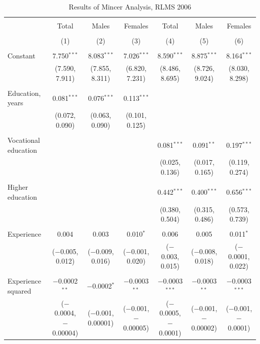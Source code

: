 \documentclass[alpha-refs]{wiley-article-01g}
\begin{document}
\begin{landscape}

\fontsize{9}{11}
\selectfont

\begin{table}[!htbp] \centering 
\renewcommand{\arraystretch}{1.0}
  \caption{Results of Mincer Analysis, RLMS 2006} 
  \label{} 
\begin{tabular}{@{\extracolsep{5pt}}lcccccc} 
\\[-1.8ex]\hline 
\hline \\[-1.8ex] 
 & Total & Males & Females & Total & Males & Females \\ 
\\[-1.8ex] & (1) & (2) & (3) & (4) & (5) & (6)\\ 
\hline \\[-1.8ex] 
 Constant & 7.750$^{***}$ & 8.083$^{***}$ & 7.026$^{***}$ & 8.590$^{***}$ & 8.875$^{***}$ & 8.164$^{***}$ \\ 
  & (7.590, 7.911) & (7.855, 8.311) & (6.820, 7.231) & (8.486, 8.695) & (8.726, 9.024) & (8.030, 8.298) \\ 
  & & & & & & \\ 
 Education, years & 0.081$^{***}$ & 0.076$^{***}$ & 0.113$^{***}$ &  &  &  \\ 
  & (0.072, 0.090) & (0.063, 0.090) & (0.101, 0.125) &  &  &  \\ 
  & & & & & & \\ 
 Vocational education &  &  &  & 0.081$^{***}$ & 0.091$^{**}$ & 0.197$^{***}$ \\ 
  &  &  &  & (0.025, 0.136) & (0.017, 0.165) & (0.119, 0.274) \\ 
  & & & & & & \\ 
 Higher education &  &  &  & 0.442$^{***}$ & 0.400$^{***}$ & 0.656$^{***}$ \\ 
  &  &  &  & (0.380, 0.504) & (0.315, 0.486) & (0.573, 0.739) \\ 
  & & & & & & \\ 
 Experience & 0.004 & 0.003 & 0.010$^{*}$ & 0.006 & 0.005 & 0.011$^{*}$ \\ 
  & ($-$0.005, 0.012) & ($-$0.009, 0.016) & ($-$0.001, 0.020) & ($-$0.003, 0.015) & ($-$0.008, 0.018) & ($-$0.0001, 0.022) \\ 
  & & & & & & \\ 
 Experience squared & $-$0.0002$^{**}$ & $-$0.0002$^{*}$ & $-$0.0003$^{**}$ & $-$0.0003$^{***}$ & $-$0.0003$^{**}$ & $-$0.0003$^{***}$ \\ 
  & ($-$0.0004, $-$0.00004) & ($-$0.001, 0.00001) & ($-$0.001, $-$0.00005) & ($-$0.0005, $-$0.0001) & ($-$0.001, $-$0.00002) & ($-$0.001, $-$0.0001) \\ 

\end{tabular}
\end{table}
\end{landscape}
\end{document}
